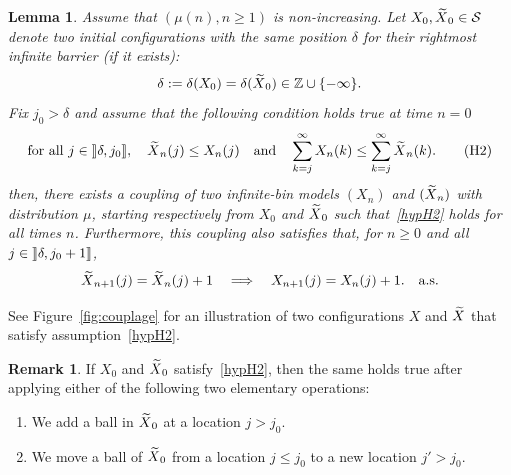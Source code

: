 \documentclass[10pt]{amsart}
\newtheorem{lemm}[theo]{Lemma}\newtheorem{prop}[theo]{Proposition}\newtheorem{coro}[theo]{Corollary}\newtheorem{conj}[theo]{Conjecture}
\theoremstyle{definition}\newtheorem{defi}[theo]{Definition}\newtheorem{rema}[theo]{Remark}\newtheorem{exam}[theo]{Example}\newtheorem{exem}[theo]{Example}\newtheorem{nota}[theo]{Notation}
\newcommand{\Z}{\mathbb{Z}}
\renewcommand{\S}{\mathcal{S}}
\let\oldin\in
\renewcommand{\in}{\mathchoice{\oldin}{\oldin}{\,\oldin\,}{\,\oldin\,}}
\let\oldtilde\tilde
\renewcommand*{\tilde}[1]{\mathchoice{\widetilde{#1}}{\widetilde{#1}}{\oldtilde{#1}}{\oldtilde{#1}}}
\newcommand{\rrbracket}{\mathclose{]\mkern -2.7mu]}}
\newcommand{\rrbracketopen}{\mathopen{]\mkern -2.7mu]}}
\newcommand{\rrb}{\rrbracket}
\begin{document}
\begin{lemm}\label{lemma:couplage2}
Assume that $(\mu(n), n \geq 1)$ is non-increasing. Let $X_0, \tilde{X}_0 \in \S$ denote two initial configurations with the same position $\delta$ for their rightmost infinite barrier (if it exists):
\[
\delta
:= \delta(X_0) = \delta(\tilde{X}_0) \in \Z\cup \{-\infty\}.
\]
Fix $j_0 > \delta$ and assume that the following condition holds true at time $n=0$
\begin{equation}\label{hypH2}
\text{for all }j \in \rrbracketopen \delta, j_0 \rrb,\quad\tilde{X}_n(j) \leq X_n(j) \quad\text{and}\quad \sum_{k =j}^{\infty} X_n(k) \leq \sum_{k= j}^{\infty} \tilde{X}_n(k).\tag{H2}
\end{equation}
then, there exists a coupling of two infinite-bin models $(X_n)$ and $(\tilde{X}_n)$ with distribution $\mu$, starting respectively from $X_0$ and $\tilde{X}_0$ such that~\eqref{hypH2} holds for all times $n$. Furthermore, this coupling also satisfies that, for $n\geq 0$ and all $j \in \rrbracketopen \delta, j_0 + 1\rrb$,
\begin{equation}\label{incH2}
\tilde{X}_{n+1} (j) = \tilde{X}_{n} (j) + 1 \quad \Longrightarrow \quad X_{n+1} (j) = X_{n} (j) + 1.\quad\text{a.s.}
\end{equation}
\end{lemm}

See Figure~\ref{fig:couplage} for an illustration of two configurations $X$ and $\tilde{X}$ that satisfy assumption~\eqref{hypH2}.

\goodbreak
\begin{rema}
If $X_0$ and $\tilde{X}_0$ satisfy~\eqref{hypH2}, then the same holds true after applying either of the following two elementary operations:
\begin{enumerate}
\item\label{rema3.3.1} We add a ball in $\tilde{X}_0$ at a location $j > j_0$.
\item\label{rema3.3.2} We move a ball of $\tilde{X}_0$ from a location $j \leq j_0$ to a new location $j' > j_0$.
\end{enumerate}
\end{rema}
\end{document}
